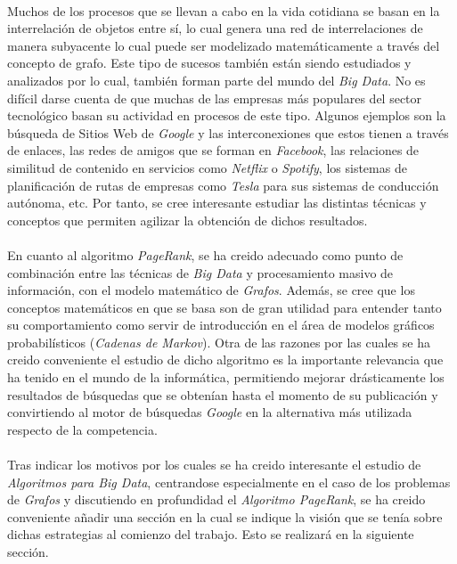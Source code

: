 \documentclass{subfiles}
\begin{document}
      \paragraph{}
      Muchos de los procesos que se llevan a cabo en la vida cotidiana se basan en la interrelación de objetos entre sí, lo cual genera una red de interrelaciones de manera subyacente lo cual puede ser modelizado matemáticamente a través del concepto de grafo. Este tipo de sucesos también están siendo estudiados y analizados por lo cual, también forman parte del mundo del \emph{Big Data}. No es difícil darse cuenta de que muchas de las empresas más populares del sector tecnológico basan su actividad en procesos de este tipo. Algunos ejemplos son la búsqueda de Sitios Web de \emph{Google} y las interconexiones que estos tienen a través de enlaces, las redes de amigos que se forman en \emph{Facebook}, las relaciones de similitud de contenido en servicios como \emph{Netflix} o \emph{Spotify}, los sistemas de planificación de rutas de empresas como \emph{Tesla} para sus sistemas de conducción autónoma, etc. Por tanto, se cree interesante estudiar las distintas técnicas y conceptos que permiten agilizar la obtención de dichos resultados.

      \paragraph{}
      En cuanto al algoritmo \emph{PageRank}, se ha creido adecuado como punto de combinación entre las técnicas de \emph{Big Data} y procesamiento masivo de información, con el modelo matemático de \emph{Grafos}. Además, se cree que los conceptos matemáticos en que se basa son de gran utilidad para entender tanto su comportamiento como servir de introducción en el área de modelos gráficos probabilísticos (\emph{Cadenas de Markov}). Otra de las razones por las cuales se ha creido conveniente el estudio de dicho algoritmo es la importante relevancia que ha tenido en el mundo de la informática, permitiendo mejorar drásticamente los resultados de búsquedas que se obtenían hasta el momento de su publicación y convirtiendo al motor de búsquedas \emph{Google} en la alternativa más utilizada respecto de la competencia.

      \paragraph{}
      Tras indicar los motivos por los cuales se ha creido interesante el estudio de \emph{Algoritmos para Big Data}, centrandose especialmente en el caso de los problemas de \emph{Grafos} y discutiendo en profundidad el \emph{Algoritmo PageRank}, se ha creido conveniente añadir una sección en la cual se indique la visión que se tenía sobre dichas estrategias al comienzo del trabajo. Esto se realizará en la siguiente sección.
\end{document}
